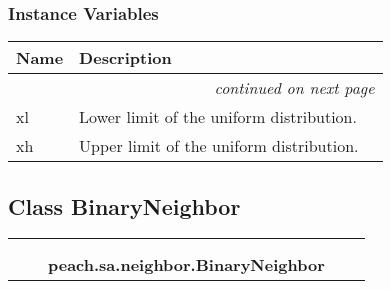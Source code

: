 
  \subsubsection{Instance Variables}

    \vspace{-1cm}
\hspace{\varindent}\begin{longtable}{|p{\varnamewidth}|p{\vardescrwidth}|l}
\cline{1-2}
\cline{1-2} \centering \textbf{Name} & \centering \textbf{Description}& \\
\cline{1-2}
\endhead\cline{1-2}\multicolumn{3}{r}{\small\textit{continued on next page}}\\\endfoot\cline{1-2}
\endlastfoot\raggedright x\-l\- & Lower limit of the uniform distribution.&\\
\cline{1-2}
\raggedright x\-h\- & Upper limit of the uniform distribution.&\\
\cline{1-2}
\end{longtable}



\subsection{Class BinaryNeighbor}

    \label{peach:sa:neighbor:BinaryNeighbor}
\begin{tabular}{cccccc}
\multicolumn{2}{r}{\settowidth{\BCL}{object}\multirow{2}{\BCL}{object}}
&&
  \\\cline{3-3}
  &&\multicolumn{1}{c|}{}
&&
  \\
&&\multicolumn{2}{l}{\textbf{peach.sa.neighbor.BinaryNeighbor}}
\end{tabular}

